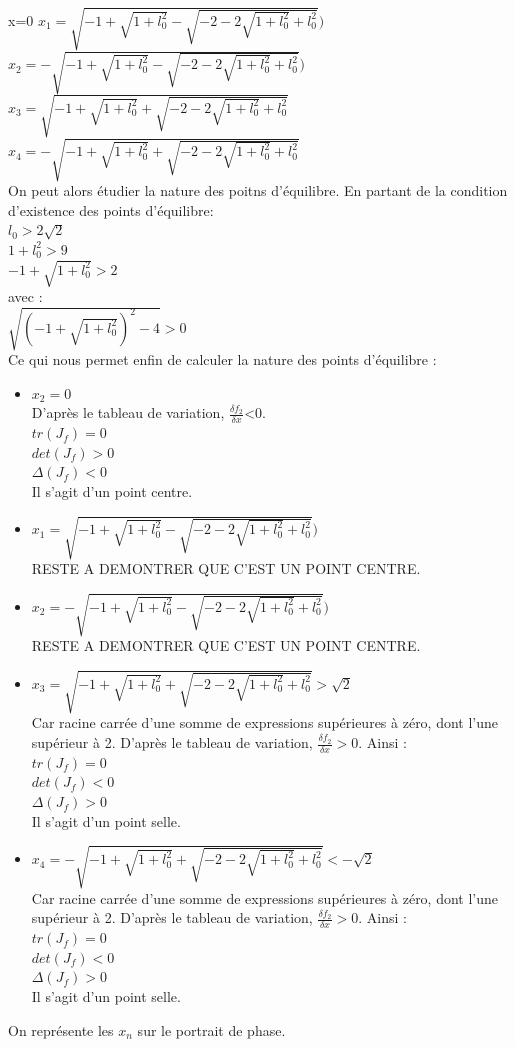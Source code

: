 \documentclass[10pt,a4paper]{article}
\begin{document}
x=0
$x_1=\sqrt{-1+\sqrt{1+l_0^2}-\sqrt{-2-2\sqrt{1+l_0^2}+l_0^2}})$\\
$x_2=-\sqrt{-1+\sqrt{1+l_0^2}-\sqrt{-2-2\sqrt{1+l_0^2}+l_0^2}})$\\
$x_3=\sqrt{-1+\sqrt{1+l_0^2}+\sqrt{-2-2\sqrt{1+l_0^2}+l_0^2}}$\\
$x_4=-\sqrt{-1+\sqrt{1+l_0^2}+\sqrt{-2-2\sqrt{1+l_0^2}+l_0^2}}$\\

On peut alors étudier la nature des poitns d'équilibre.
En partant de la condition d'existence des points d'équilibre:\\
$l_0>2\sqrt{2}$\\
$1+l_0^2>9$\\
$-1+\sqrt{1+l_0^2}>2$\\
avec :\\
$\sqrt{(-1+\sqrt{1+l_0^2})^2-4}>0$\\
Ce qui nous permet enfin de calculer la nature des points d'équilibre :
\begin{itemize}
\item $x_2=0$\\
D'après le tableau de variation, $\frac{\delta f_2}{\delta x}$<0.\\
$tr(J_f) = 0 $\\
$det(J_f) > 0 $\\
$\Delta(J_f) < 0$\\
Il s'agit d'un point centre.
\item $x_1=\sqrt{-1+\sqrt{1+l_0^2}-\sqrt{-2-2\sqrt{1+l_0^2}+l_0^2}})$\\
RESTE A DEMONTRER QUE C'EST UN POINT CENTRE.
\item $x_2=-\sqrt{-1+\sqrt{1+l_0^2}-\sqrt{-2-2\sqrt{1+l_0^2}+l_0^2}})$\\
RESTE A DEMONTRER QUE C'EST UN POINT CENTRE.
\item $x_3=\sqrt{-1+\sqrt{1+l_0^2}+\sqrt{-2-2\sqrt{1+l_0^2}+l_0^2}}>\sqrt{2}$\\
Car racine carrée d'une somme de expressions supérieures à zéro, dont l'une supérieur à 2.
D'après le tableau de variation, $\frac{\delta f_2}{\delta x}>0$. Ainsi :\\
$tr(J_f) = 0 $\\
$det(J_f) < 0 $\\
$\Delta(J_f) > 0$\\
Il s'agit d'un point selle.
\item $x_4=-\sqrt{-1+\sqrt{1+l_0^2}+\sqrt{-2-2\sqrt{1+l_0^2}+l_0^2}}<-\sqrt{2}$\\
Car racine carrée d'une somme de expressions supérieures à zéro, dont l'une supérieur à 2.
D'après le tableau de variation, $\frac{\delta f_2}{\delta x}>0$. Ainsi :\\
$tr(J_f) = 0 $\\
$det(J_f) < 0 $\\
$\Delta(J_f) > 0$\\
Il s'agit d'un point selle.
\end{itemize}
On représente les $x_n$ sur le portrait de phase.
\end{document}
